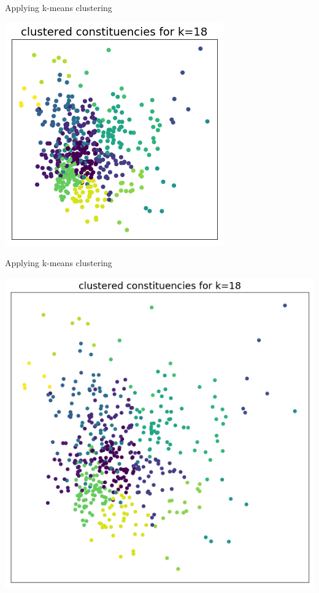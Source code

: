 \documentclass{beamer}
\begin{document}
\begin{frame}{Applying k-means clustering}
  \begin{center}
    \includegraphics[scale=.40]{../gfx/cluster_colour_small.png}
  \end{center}
\end{frame}

\begin{frame}{Applying k-means clustering}
  \begin{center}
    \includegraphics[scale=.35]{../gfx/cluster_colour.png}
  \end{center}
\end{frame}
\end{document}
